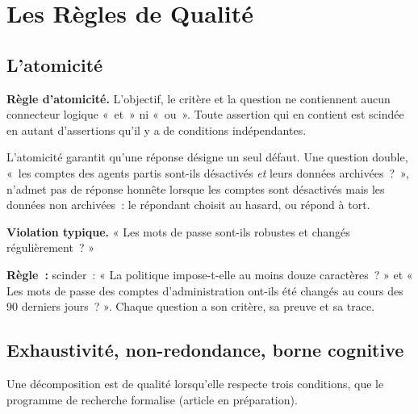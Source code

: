 \section{Les Règles de Qualité}
\label{sec:c07-regles}

\subsection{L'atomicité}

\begin{boxinfo}
\textbf{Règle d'atomicité.} L'objectif, le critère et la question ne
contiennent aucun connecteur logique «~et~» ni «~ou~». Toute assertion qui
en contient est scindée en autant d'assertions qu'il y a de conditions
indépendantes.
\end{boxinfo}

L'atomicité garantit qu'une réponse \NON{} désigne un seul défaut. Une
question double, «~les comptes des agents partis sont-ils désactivés
\emph{et} leurs données archivées~?~», n'admet pas de réponse honnête
lorsque les comptes sont désactivés mais les données non archivées~: le
répondant choisit au hasard, ou répond \NEK{} à tort.

\begin{boxalert}
\textbf{Violation typique.} « Les mots de passe sont-ils robustes et
changés régulièrement~? »

\smallskip
\textbf{Règle~:} scinder~: « La politique impose-t-elle au moins douze
caractères~? » et « Les mots de passe des comptes d'administration ont-ils
été changés au cours des 90 derniers jours~? ». Chaque question a son
critère, sa preuve et sa trace.
\end{boxalert}

\subsection{Exhaustivité, non-redondance, borne cognitive}

Une décomposition est de qualité lorsqu'elle respecte trois conditions,
que le programme de recherche formalise (article en préparation).

